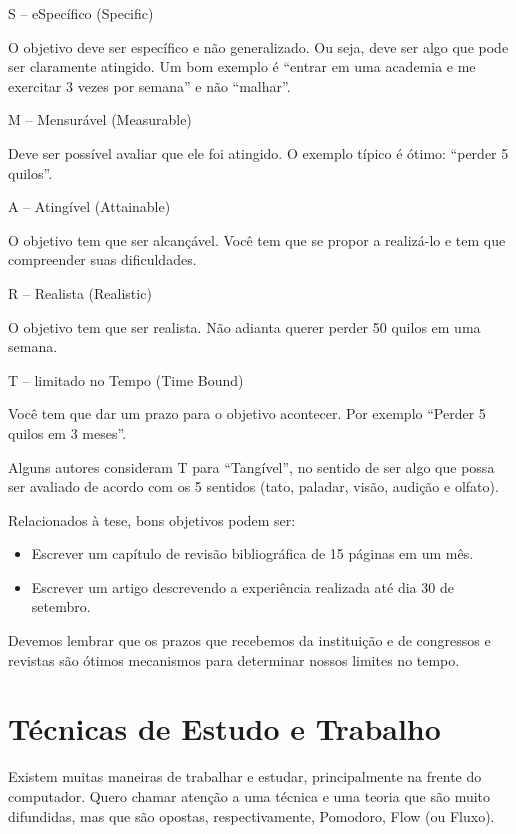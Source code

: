 \begin{outline}
\1	S – eSpecífico (Specific)


\2	O objetivo deve ser específico e não generalizado. Ou seja, deve ser algo que pode ser claramente atingido. Um bom exemplo é “entrar em uma academia e me exercitar 3 vezes por semana” e não “malhar”. 


\1	M – Mensurável (Measurable)


\2	Deve ser possível avaliar que ele foi atingido. O exemplo típico é ótimo: “perder 5 quilos”.


\1	A – Atingível (Attainable)


\2	O objetivo tem que ser alcançável. Você tem que se propor a realizá-lo e tem que compreender suas dificuldades.


\1	R – Realista (Realistic)


\2	O objetivo tem que ser realista. Não adianta querer perder 50 quilos em uma semana. 


\1	T – limitado no Tempo (Time Bound)


\2	Você tem que dar um prazo para o objetivo acontecer. Por exemplo “Perder 5 quilos em 3 meses”.


\2	Alguns autores consideram T para “Tangível”, no sentido de ser algo que possa ser avaliado de acordo com os 5 sentidos (tato, paladar, visão, audição e olfato). 
\end{outline}

Relacionados à tese, bons objetivos podem ser:

\begin{itemize}
	\item	Escrever um capítulo de revisão bibliográfica de 15 páginas em um mês.
	
	
	\item	Escrever um artigo descrevendo a experiência realizada até dia 30 de setembro.
	
\end{itemize}


Devemos lembrar que os prazos que recebemos da instituição e de congressos e revistas são ótimos mecanismos para determinar nossos limites no tempo.



\section{Técnicas de Estudo e Trabalho}


Existem muitas maneiras de trabalhar e estudar, principalmente na frente do computador. Quero chamar atenção a uma técnica e uma teoria que são muito difundidas, mas que são opostas, respectivamente, Pomodoro, Flow (ou Fluxo).



